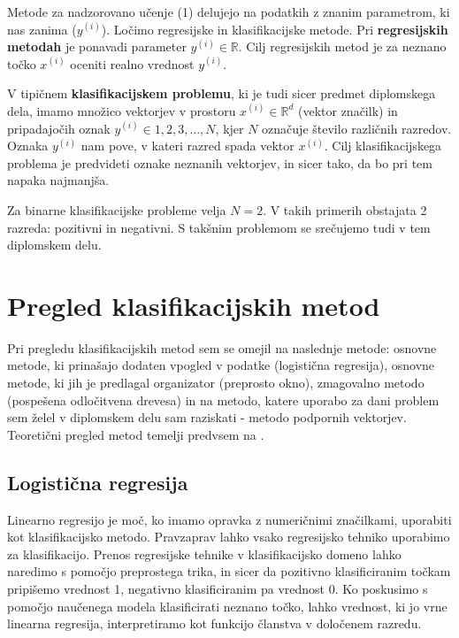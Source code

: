 \documentclass[11pt,a4paper,openany]{book}
\begin{document}
Metode za nadzorovano učenje (1) delujejo na podatkih z znanim parametrom, ki nas zanima ($y^{(i)}$). Ločimo regresijske in klasifikacijske metode. Pri \textbf{regresijskih metodah} je ponavadi parameter $y^{(i)} \in \mathbb{R}$. Cilj regresijskih metod je za neznano točko $x^{(i)}$ oceniti realno vrednost $y^{(i)}$. 

V tipičnem \textbf{klasifikacijskem problemu}, ki je tudi sicer predmet diplomskega dela, imamo množico vektorjev v prostoru $x^{(i)} \in \mathbb{R}^d$ (vektor značilk) in pripadajočih oznak $y^{(i)} \in {1, 2, 3, \ldots, N}$, kjer $N$ označuje število različnih razredov. Oznaka $y^{(i)}$ nam pove, v kateri razred spada vektor $x^{(i)}$. Cilj klasifikacijskega problema je predvideti oznake neznanih vektorjev, in sicer tako, da bo pri tem napaka najmanjša.

Za binarne klasifikacijske probleme velja $N = 2$. V takih primerih obstajata 2 razreda: pozitivni in negativni. S takšnim problemom se srečujemo tudi v tem diplomskem delu.


\section{Pregled klasifikacijskih metod}

Pri pregledu klasifikacijskih metod sem se omejil na naslednje metode: osnovne metode, ki prinašajo dodaten vpogled v podatke (logistična regresija), osnovne metode, ki jih je predlagal organizator (preprosto okno), zmagovalno metodo (pospešena odločitvena drevesa) in na metodo, katere uporabo za dani problem sem želel v diplomskem delu sam raziskati - metodo podpornih vektorjev. Teoretični pregled metod temelji predvsem na \cite{AndrewNgML}.


\subsection{Logistična regresija}

Linearno regresijo je moč, ko imamo opravka z numeričnimi značilkami, uporabiti kot klasifikacijsko metodo. Pravzaprav lahko vsako regresijsko tehniko uporabimo za klasifikacijo. Prenos regresijske tehnike v klasifikacijsko domeno lahko naredimo s pomočjo preprostega trika, in sicer da pozitivno klasificiranim točkam pripišemo vrednost 1, negativno klasificiranim pa vrednost 0. Ko poskusimo s pomočjo naučenega modela klasificirati neznano točko, lahko vrednost, ki jo vrne linearna regresija, interpretiramo kot funkcijo članstva v določenem razredu. \cite{Witten2005}
\end{document}
